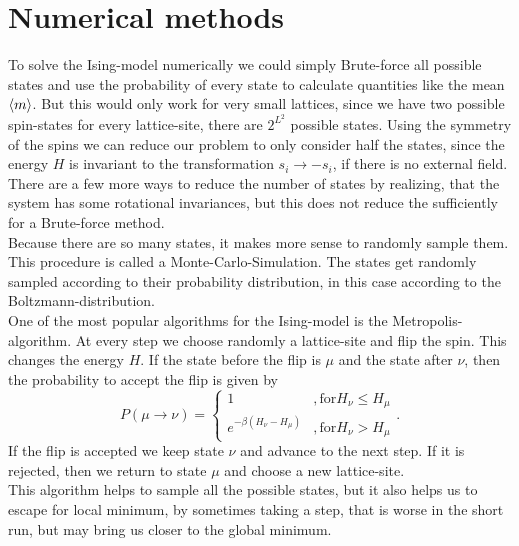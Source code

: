 \section{Numerical methods}
To solve the Ising-model numerically we could simply Brute-force all possible states and use the probability of every state to calculate quantities like the mean $\left\langle m\right\rangle$. But this would only work for very small lattices, since we have two possible spin-states for every lattice-site, there are $2^{L^2}$ possible states. Using the symmetry of the spins we can reduce our problem to only consider half the states, since the energy $H$ is invariant to the transformation $s_i \to -s_i$, if there is no external field. There are a few more ways to reduce the number of states by realizing, that the system has some rotational invariances, but this does not reduce the sufficiently for a Brute-force method.\\
Because there are so many states, it makes more sense to randomly sample them. This procedure is called a Monte-Carlo-Simulation. The states get randomly sampled according to their probability distribution, in this case according to the Boltzmann-distribution.\\
One of the most popular algorithms for the Ising-model is the Metropolis-algorithm. At every step we choose randomly a lattice-site and flip the spin. This changes the energy $H$. If the state before the flip is $\mu$ and the state after $\nu$, then the probability to accept the flip is given by
\begin{equation}
  P(\mu \rightarrow \nu) =
  \begin{cases}
    1  &, \text{for} H_{\nu} \leq H_{\mu} \\
    e^{-\beta (H_{\nu} - H_{\mu})} &, \text{for} H_{\nu} > H_{\mu}
  \end{cases}.
\end{equation}
If the flip is accepted we keep state $\nu$ and advance to the next step. If it is rejected, then we return to state $\mu$ and choose a new lattice-site.\\
This algorithm helps to sample all the possible states, but it also helps us to escape for local minimum, by sometimes taking a step, that is worse in the short run, but may bring us closer to the global minimum.\\

